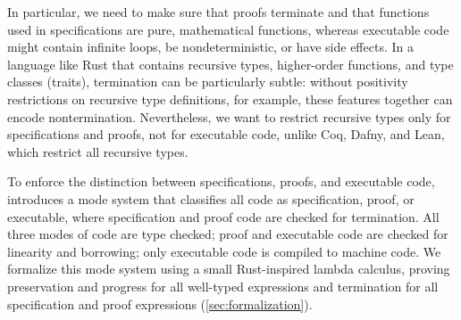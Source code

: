 In particular, we need to make sure that proofs terminate
and that functions used in specifications are pure, mathematical functions,
whereas executable code might contain infinite loops,
be nondeterministic, or have side effects.
In a language like Rust that contains recursive types, higher-order functions,
and type classes (traits), termination can be particularly subtle:
without positivity restrictions on recursive type definitions, for example,
these features together can encode nontermination.
Nevertheless, we want to restrict recursive types only for specifications and proofs,
not for executable code, unlike Coq, Dafny, and Lean,
which restrict all recursive types.

To enforce the distinction between specifications, proofs, and executable code,
\verus introduces a mode system that classifies all code as
specification, proof, or executable,
where specification and proof code are checked for termination.
All three modes of code are type checked;
proof and executable code are checked for linearity and borrowing;
only executable code is compiled to machine code.
We formalize this mode system using a small Rust-inspired lambda calculus,
proving preservation and progress for all well-typed expressions
and termination for all specification and proof expressions (\autoref{sec:formalization}).

